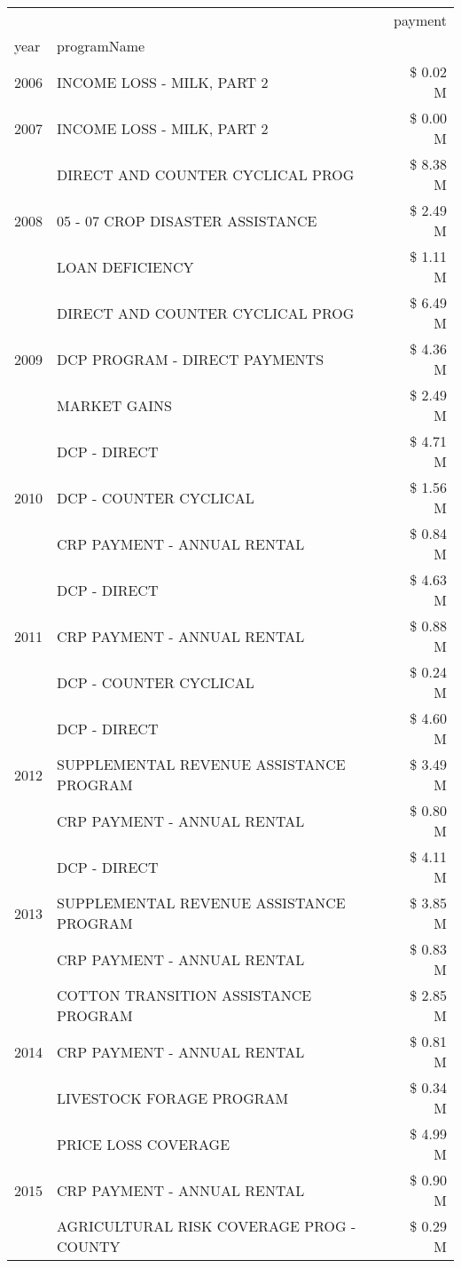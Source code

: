 \begin{tabular}{llr}
\toprule
 &  & payment \\
year & programName &  \\
\midrule
2006 & INCOME LOSS - MILK, PART 2 & \$ 0.02 M \\
\cline{1-3}
2007 & INCOME LOSS - MILK, PART 2 & \$ 0.00 M \\
\cline{1-3}
\multirow[t]{3}{*}{2008} & DIRECT AND COUNTER CYCLICAL PROG & \$ 8.38 M \\
 & 05 - 07 CROP DISASTER ASSISTANCE & \$ 2.49 M \\
 & LOAN DEFICIENCY & \$ 1.11 M \\
\cline{1-3}
\multirow[t]{3}{*}{2009} & DIRECT AND COUNTER CYCLICAL PROG & \$ 6.49 M \\
 & DCP PROGRAM - DIRECT PAYMENTS & \$ 4.36 M \\
 & MARKET GAINS & \$ 2.49 M \\
\cline{1-3}
\multirow[t]{3}{*}{2010} & DCP - DIRECT & \$ 4.71 M \\
 & DCP - COUNTER CYCLICAL & \$ 1.56 M \\
 & CRP PAYMENT - ANNUAL RENTAL & \$ 0.84 M \\
\cline{1-3}
\multirow[t]{3}{*}{2011} & DCP - DIRECT & \$ 4.63 M \\
 & CRP PAYMENT - ANNUAL RENTAL & \$ 0.88 M \\
 & DCP - COUNTER CYCLICAL & \$ 0.24 M \\
\cline{1-3}
\multirow[t]{3}{*}{2012} & DCP - DIRECT & \$ 4.60 M \\
 & SUPPLEMENTAL REVENUE ASSISTANCE PROGRAM & \$ 3.49 M \\
 & CRP PAYMENT - ANNUAL RENTAL & \$ 0.80 M \\
\cline{1-3}
\multirow[t]{3}{*}{2013} & DCP - DIRECT & \$ 4.11 M \\
 & SUPPLEMENTAL REVENUE ASSISTANCE PROGRAM & \$ 3.85 M \\
 & CRP PAYMENT - ANNUAL RENTAL & \$ 0.83 M \\
\cline{1-3}
\multirow[t]{3}{*}{2014} & COTTON TRANSITION ASSISTANCE PROGRAM & \$ 2.85 M \\
 & CRP PAYMENT - ANNUAL RENTAL & \$ 0.81 M \\
 & LIVESTOCK FORAGE PROGRAM & \$ 0.34 M \\
\cline{1-3}
\multirow[t]{3}{*}{2015} & PRICE LOSS COVERAGE & \$ 4.99 M \\
 & CRP PAYMENT - ANNUAL RENTAL & \$ 0.90 M \\
 & AGRICULTURAL RISK COVERAGE PROG - COUNTY & \$ 0.29 M \\

\end{tabular}
